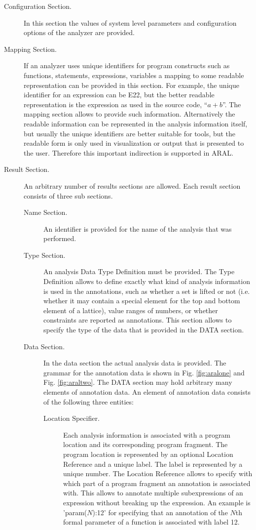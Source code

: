 \begin{description}
\item [Configuration Section.] In this section the values of system
level parameters and configuration options of the analyzer are
provided.
\item [Mapping Section.] If an analyzer uses unique identifiers for
program constructs such as functions, statements, expressions,
variables a mapping to some readable representation can be provided in
this section. For example, the unique identifier for an expression can
be E22, but the better readable representation is the expression as
used in the source code, ``$a+b$''. The mapping section allows to
provide such information. Alternatively the readable information can
be represented in the analysis information itself, but usually the
unique identifiers are better suitable for tools, but the readable
form is only used in visualization or output that is presented to the
user. Therefore this important indirection is supported in ARAL.
\item [Result Section.] An arbitrary number of results sections are allowed.
Each result section consists of three sub sections.

\begin{description}
\item [Name Section.] An identifier is provided for the name of the analysis that was performed.
\item [Type Section.] An analysis Data Type Definition must be
provided.  The Type Definition allows to define exactly what kind of
analysis information is used in the annotations, such as whether a set
is lifted or not (i.e. whether it may contain a special element for
the top and bottom element of a lattice), value ranges of numbers, or
whether constraints are reported as annotations. This section allows
to specify the type of the data that is provided in the DATA section.
\item [Data Section.]
In the data section the actual analysis data is provided. The grammar
for the annotation data is shown in Fig. \ref{fig:aralone} and
Fig. \ref{fig:araltwo}. The DATA section may hold arbitrary many
elements of annotation data. An element of annotation data consists of the following three entities:

\begin{description}
\item [Location Specifier.] Each analysis information is associated with a
program location and its corresponding program fragment. The program
location is represented by an optional Location Reference and a unique
label. The label is represented by a unique number.
The Location Reference allows to specify with which
part of a program fragment an annotation is associated with. This allows to
annotate multiple subexpressions of an expression without breaking up
the expression. An example is 'param($N$):12' for specifying that an annotation
of the $N$th formal parameter of a function is associated with label 12.


\end{description}
\end{description}
\end{description}

